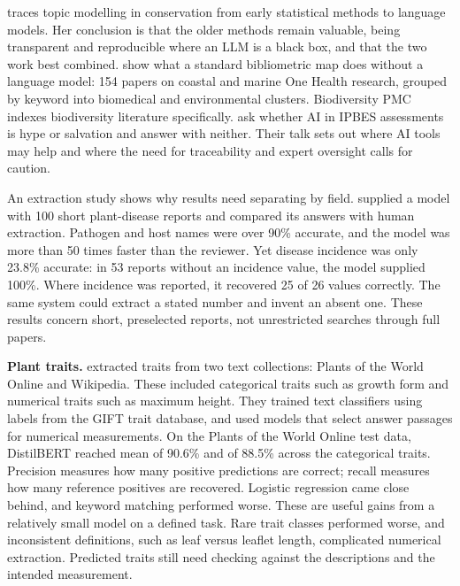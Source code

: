 \textcite{takola2026topicmodelling} traces topic modelling in conservation from
early statistical methods to language models. Her conclusion is that the older
methods remain valuable, being transparent and reproducible where an LLM is a
black box, and that the two work best combined. \textcite{ioannou2025onehealth}
show what a standard bibliometric map does without a language model: 154
papers on coastal and marine One Health research, grouped by keyword into
biomedical and environmental clusters. Biodiversity PMC \parencite{pasche2026biodivpmc} indexes
biodiversity literature specifically. \textcite{krug2026ipbes} ask whether AI in
IPBES assessments is hype or salvation and answer with neither. Their talk sets
out where AI tools may help and where the need for traceability and expert
oversight calls for caution.

An extraction study shows why results need separating by field.
\textcite{gougherty2024extraction} supplied a model with 100 short plant-disease
reports and compared its answers with human extraction. Pathogen and host names
were over 90\% accurate, and the model was more than 50 times faster than the
reviewer. Yet disease incidence was only 23.8\% accurate: in 53 reports without
an incidence value, the model supplied 100\%. Where incidence was reported, it
recovered 25 of 26 values correctly. The same system could extract a stated number and invent an absent
one. These results concern short, preselected reports, not unrestricted searches
through full papers.

\textbf{Plant traits.} \textcite{domazetoski2025traits} extracted traits from
two text collections: Plants of the World Online and Wikipedia. These included
categorical traits such
as growth form and numerical traits such as maximum height. They trained text
classifiers using labels from the GIFT trait database, and used models that
select answer passages for numerical measurements. On the Plants of the World
Online test data, DistilBERT reached mean  of 90.6\% and
 of 88.5\% across the categorical traits. Precision measures how
many positive predictions are correct; recall measures how many reference
positives are recovered. Logistic regression came close behind, and keyword
matching performed worse. These are useful gains from a relatively small model on a defined task. Rare trait classes
performed worse, and inconsistent definitions, such as leaf versus leaflet
length, complicated numerical extraction. Predicted traits still need checking
against the descriptions and the intended measurement.

